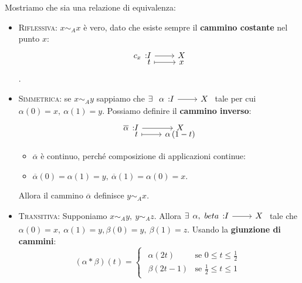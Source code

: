\begin{demonstration}
	Mostriamo che sia una relazione di equivalenza:
	\begin{itemize}
		\item \textsc{Riflessiva}: $x\sim_A x$ è vero, dato che esiste sempre il \textbf{cammino costante} nel punto $x$: \begin{equation}
			\funztot{c_x}{I}{X}{t}{x}
		\end{equation}.
		\item \textsc{Simmetrica}: se $x\sim_A y$ sappiamo che $\exists\ \funz{\alpha}{I}{X}$ tale per cui $\alpha\left(0\right)=x,\ \alpha\left(1\right)=y$. Possiamo definire il \textbf{cammino inverso}:
		\begin{equation}
			\funztot{\overline{\alpha}}{I}{X}{t}{\alpha\left(1-t\right)}
		\end{equation}
	\begin{itemize}
		\item $\overline{\alpha}$ è continuo, perché composizione di applicazioni continue:\\
		\begin{center}
		\end{center}
	\item $\overline{\alpha}\left(0\right)=\alpha\left(1\right)=y,\ \overline{\alpha}\left(1\right)=\alpha\left(0\right)=x$.
	\end{itemize}
Allora il cammino $\overline{\alpha}$ definisce $y\sim_A x$.
		\item \textsc{Transitiva}: Supponiamo $x\sim_A y,\ y\sim_A z$. Allora $\exists \funz{\alpha,\ beta}{I}{X}$ tale che $\alpha\left(0\right)=x,\ \alpha\left(1\right)=y, \beta\left(0\right)=y,\ \beta\left(1\right)=z$. Usando la \textbf{giunzione di cammini}:
	\begin{equation}
	\left(\alpha\ast\beta\right)\left(t\right)=\begin{cases}
		\begin{array}{lc}
					\alpha\left(2t\right) & \text{se }0\leq t\leq \frac{1}{2}\\
			\beta\left(2t-1\right) & \text{se }\frac{1}{2}\leq t\leq 1	
		\end{array}

\end{cases}
\end{equation}
\end{itemize}
\end{demonstration}
